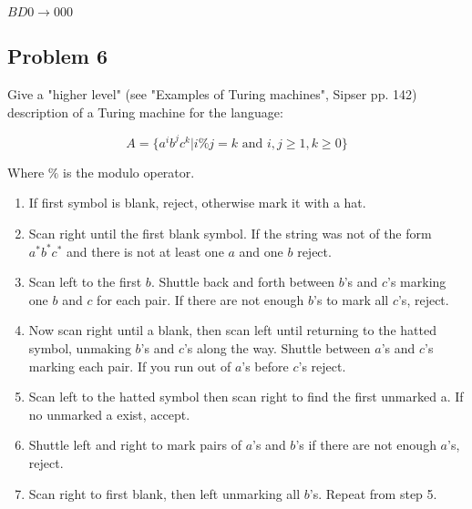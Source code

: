 \documentclass{article}
\begin{document}
    $BD0 \rightarrow 000$


    \newpage
    \subsection*{Problem 6}
    Give a "higher level" (see "Examples of Turing machines", Sipser pp. 142) description of a
    Turing machine for the language:

    \[A=\{a^ib^jc^k | i\%j=k \text{ and } i,j\ge1, k \geq 0\}\]

    Where $\%$ is the modulo operator.

    \begin{enumerate}[1)]

    \item If first symbol is blank, reject, otherwise mark it with a hat.

    \item Scan right until the first blank symbol. If the string was not of the form
    $a^*b^*c^*$ and there is not at least one $a$ and one $b$ reject.

    \item Scan left to the first $b$. Shuttle back and forth between $b$'s and 
    $c$'s marking one $b$ and $c$ for each pair. If there are not enough $b$'s
    to mark all $c$'s, reject.

    \item Now scan right until a blank, then scan left until returning to the
    hatted symbol, unmaking $b$'s and $c$'s along the way. Shuttle between $a$'s
    and $c$'s marking each pair. If you run out of $a$'s before $c$'s reject.

    \item Scan left to the hatted symbol then scan right to find the first
    unmarked a. If no unmarked a exist, accept.

    \item Shuttle left and right to mark pairs of $a$'s and $b$'s if there
    are not enough $a$'s, reject.

    \item Scan right to first blank, then left unmarking all $b$'s. Repeat from
    step 5.

    \end{enumerate}

    
\end{document}

